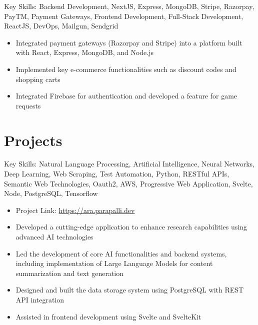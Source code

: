 \documentclass[11pt,a4paper,sans]{moderncv}
\newcommand{\customsection}[1]{%
  \section{\textcolor{color1}{\textbf{#1}}}%
}
\begin{document}
{Key Skills: Backend Development, NextJS, Express, MongoDB, Stripe, Razorpay, PayTM, Payment Gateways, Frontend Development, Full-Stack Development, ReactJS, DevOps, Mailgun, Sendgrid
\begin{itemize}
\item Integrated payment gateways (Razorpay and Stripe) into a platform built with React, Express, MongoDB, and Node.js
\item Implemented key e-commerce functionalities such as discount codes and shopping carts
\item Integrated Firebase for authentication and developed a feature for game requests
\end{itemize}}

\customsection{Projects}
{Key Skills: Natural Language Processing, Artificial Intelligence, Neural Networks, Deep Learning, Web Scraping, Test Automation, Python, RESTful APIs, Semantic Web Technologies, Oauth2, AWS, Progressive Web Application, Svelte, Node, PostgreSQL, Tensorflow
\begin{itemize}
\item Project Link: \url{https://ara.parapalli.dev}
\item Developed a cutting-edge application to enhance research capabilities using advanced AI technologies
\item Led the development of core AI functionalities and backend systems, including implementation of Large Language Models for content summarization and text generation
\item Designed and built the data storage system using PostgreSQL with REST API integration
\item Assisted in frontend development using Svelte and SvelteKit
\end{itemize}}
\end{document}
